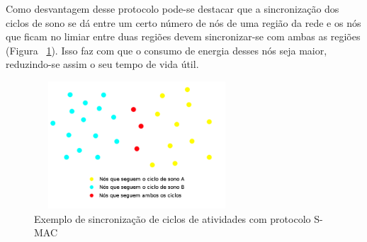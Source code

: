 Como desvantagem desse protocolo pode-se destacar que a sincronização dos ciclos de sono se dá entre um certo número de nós de uma região da rede e os nós que ficam no limiar entre duas regiões devem sincronizar-se com ambas as regiões (Figura ~\ref{fig:SmacSynch}). Isso faz com que o consumo de energia desses nós seja maior, reduzindo-se assim o seu tempo de vida útil.

\begin{figure}[!htb]
\centering
\includegraphics[width=290px,height=180px]{./Pictures/S-MACSynchronization.png}
\caption{Exemplo de sincronização de ciclos de atividades com protocolo S-MAC} %
\label{fig:SmacSynch} %
\end{figure}
 
 



% 

